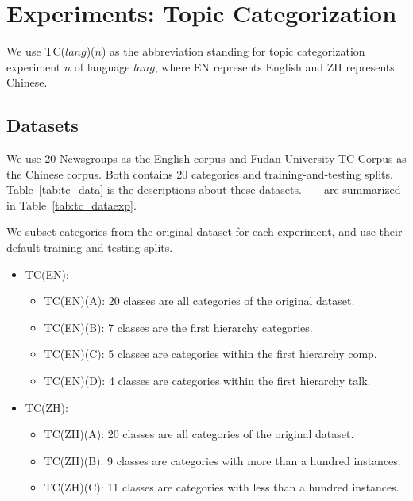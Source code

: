 
\vspace{-1.75\intextsep}


\vspace{-1.75\intextsep}


\vspace{-1.75\intextsep}



\section{Experiments: Topic Categorization}
We use TC($lang$)($n$) as the abbreviation standing for topic categorization experiment $n$ of language $lang$, where EN represents English and ZH represents Chinese.
\subsection{Datasets}
We use 20 Newsgroups\cite{20news} as the English corpus and Fudan University TC Corpus\cite{fudan} as the Chinese corpus.
Both contains 20 categories and training-and-testing splits.
Table~\ref{tab:tc_data} is the descriptions about these datasets.
~\newline
~\newline
{} are summarized in Table~\ref{tab:tc_dataexp}.
\par We subset categories from the original dataset for each experiment, and use their default training-and-testing splits.
\begin{itemize}
\item TC(EN):
	\begin{itemize}
	\item TC(EN)(A): 20 classes are all categories of the original dataset.
	\item TC(EN)(B): 7 classes are the first hierarchy categories.
	\item TC(EN)(C): 5 classes are categories within the first hierarchy comp.
	\item TC(EN)(D): 4 classes are categories within the first hierarchy talk.
	\end{itemize}
\item TC(ZH):
	\begin{itemize}
	\item TC(ZH)(A): 20 classes are all categories of the original dataset.
	\item TC(ZH)(B): 9 classes are categories with more than a hundred instances.
	\item TC(ZH)(C): 11 classes are categories with less than a hundred instances.
	\end{itemize}
\end{itemize}



